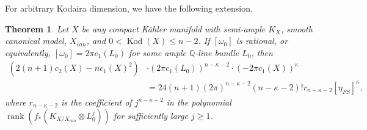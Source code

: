 \documentclass[12pt]{article}
\newtheorem{theorem}{Theorem}[section]
\numberwithin{equation}{section}
\newcommand{\Q}{\mathbb{Q}}
\DeclareMathOperator{\Kod}{Kod}
\DeclareMathOperator{\rank}{rank}
\begin{document}
\noindent For arbitrary Kodaira dimension, we have the following extension.

\begin{theorem}
Let $X$ be any compact K\"ahler manifold with semi-ample $K_X$, smooth canonical model, $X_{can}$, and $0 < \Kod(X) \leq n-2$. If $[\omega_0]$ is rational, or equivalently, $[\omega_0] = 2 \pi c_1(L_0)$ for some ample $\Q$-line bundle $L_0$, then
\begin{align*}
    (2(n+1) c_2(X) - n c_1(X)^2) &\cdot (2 \pi c_1(L_0))^{n-\kappa-2} \cdot (-2 \pi c_1(X))^{\kappa}\\
    &=  24 (n+1) (2\pi )^{n-\kappa-2}(n-\kappa-2)! r_{n-\kappa-2} [\eta_{FS}]^\kappa,
\end{align*}
where $r_{n-\kappa-2}$ is the coefficient of $j^{n-\kappa-2}$ in the polynomial $\rank(f_*(K_{X/X_{can}}\otimes L_0^j))$ for sufficiently large $j\geq 1$.
\end{theorem}
\end{document}
